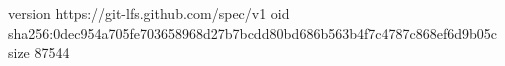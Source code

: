 version https://git-lfs.github.com/spec/v1
oid sha256:0dec954a705fe703658968d27b7bcdd80bd686b563b4f7c4787c868ef6d9b05c
size 87544
